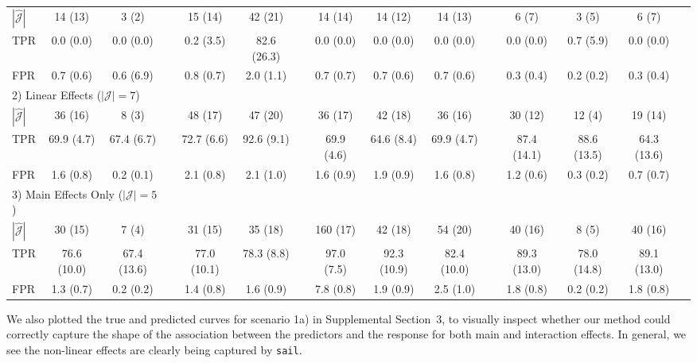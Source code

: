 \documentclass[useAMS,usenatbib,referee]{biom}
\newcommand{\sail}{\texttt{sail}}
\newcommand{\mcl}[2]{\multicolumn{#1}{l}{#2}}
\begin{document}
\begin{table}
\begin{tabular}{lcccccccccccccc}
$|\widehat{\mathcal{J}}|$ & 14 (13) & 3 (2) &  & 15 (14) & 42 (21) & &  14 (14) & 14 (12) & 14 (13) & &  6 (7) & 3 (5) & 6 (7)  \\ 
TPR & 0.0 (0.0) & 0.0 (0.0) & &  0.2 (3.5) & 82.6 (26.3) & &  0.0 (0.0) & 0.0 (0.0) & 0.0 (0.0) & &  0.0 (0.0) & 0.7 (5.9) & 0.0 (0.0)  \\ 
FPR & 0.7 (0.6) & 0.6 (6.9) & &  0.8 (0.7) & 2.0 (1.1) &  & 0.7 (0.7) & 0.7 (0.6) & 0.7 (0.6) &  & 0.3 (0.4) & 0.2 (0.2) & 0.3 (0.4)  \\
\hline
\mcl{3}{2) Linear Effects ($|\mathcal{J}|=7$)}\\
$|\widehat{\mathcal{J}}|$ & 36 (16) & 8 (3) & &  48 (17) & 47 (20) & &  36 (17) & 42 (18) & 36 (16) & &  30 (12) & 12 (4) & 19 (14)  \\ 
TPR & 69.9 (4.7) & 67.4 (6.7) & &  72.7 (6.6) & 92.6 (9.1) & &  69.9 (4.6) & 64.6 (8.4) & 69.9 (4.7) & &  87.4 (14.1) & 88.6 (13.5) & 64.3 (13.6)  \\ 
FPR & 1.6 (0.8) & 0.2 (0.1) & &  2.1 (0.8) & 2.1 (1.0) & &  1.6 (0.9) & 1.9 (0.9) & 1.6 (0.8) & &  1.2 (0.6) & 0.3 (0.2) & 0.7 (0.7)  \\
\hline
\mcl{3}{3) Main Effects Only ($|\mathcal{J}|=5$)}\\
$|\widehat{\mathcal{J}}|$ & 30 (15) & 7 (4) & &  31 (15) & 35 (18) & &  160 (17) & 42 (18) & 54 (20) & &  40 (16) & 8 (5) & 40 (16) \\ 
TPR & 76.6 (10.0) & 67.4 (13.6) & &  77.0 (10.1) & 78.3 (8.8) & &  97.0 (7.5) & 92.3 (10.9) & 82.4 (10.0) & &  89.3 (13.0) & 78.0 (14.8) & 89.1 (13.0)  \\ 
FPR & 1.3 (0.7) & 0.2 (0.2) & &  1.4 (0.8) & 1.6 (0.9) & &  7.8 (0.8) & 1.9 (0.9) & 2.5 (1.0) & &  1.8 (0.8) & 0.2 (0.2) & 1.8 (0.8)  \\
\hline
	\end{tabular}
\end{table}

We also plotted the true and predicted curves for scenario 1a) in Supplemental Section~3, to visually inspect whether our method could correctly capture the shape of the association between the predictors and the response for both main and interaction effects. In general, we see the non-linear effects are clearly being captured by \sail. 

\end{document}

